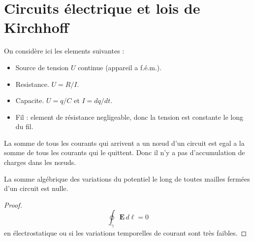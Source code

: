 \section{Circuits électrique et lois de Kirchhoff}
On considère ici les elements suivantes :
\begin{itemize}
\item Source de tension  $U$ continue (appareil a f.é.m.).
\item Resistance. $U=R/I$.
\item Capacite. $U=q/C$ et $I=dq/dt$.
\item Fil : element de résistance negligeable, donc la tension est constante le long du fil.
\end{itemize}
\begin{theorem}
La somme de tous les courants qui arrivent a un nœud d'un circuit est egal a la somme de tous les courants qui le quittent. Donc il n'y a pas d'accumulation de charges dans les nœuds.
\end{theorem}
\begin{theorem}
La somme algébrique des variations du potentiel le long de toutes mailles fermées d'un circuit est nulle.
\end{theorem}
\begin{proof}
$$
\oint _{\gamma}\boldsymbol{E}\,d\boldsymbol{\ell}=0
$$
en électrostatique ou si les variations temporelles de courant sont très faibles.
\end{proof}
